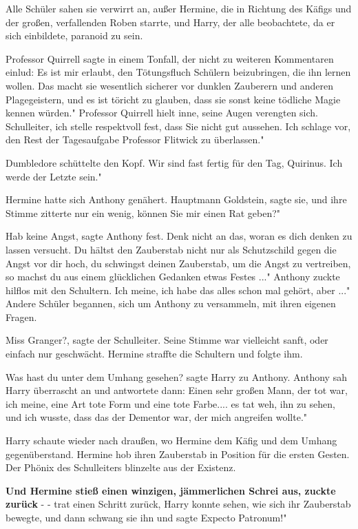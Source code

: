 Alle Schüler sahen sie verwirrt an, außer Hermine, die in Richtung des Käfigs
und der großen, verfallenden Roben starrte, und Harry, der alle beobachtete, da
er sich einbildete, paranoid zu sein.

Professor Quirrell sagte in einem Tonfall, der nicht zu weiteren Kommentaren
einlud: \glqq{}Es ist mir erlaubt, den Tötungsfluch Schülern beizubringen, die
ihn lernen wollen. Das macht sie wesentlich sicherer vor dunklen Zauberern und
anderen Plagegeistern, und es ist töricht zu glauben, dass sie sonst keine
tödliche Magie kennen würden." Professor Quirrell hielt inne, seine Augen
verengten sich. \glqq{}Schulleiter, ich stelle respektvoll fest, dass Sie nicht
gut aussehen. Ich schlage vor, den Rest der Tagesaufgabe Professor Flitwick zu
überlassen."

Dumbledore schüttelte den Kopf. \glqq{}Wir sind fast fertig für den Tag,
Quirinus. Ich werde der Letzte sein."

Hermine hatte sich Anthony genähert. \glqq{}Hauptmann Goldstein\grqq{}, sagte
sie, und ihre Stimme zitterte nur ein wenig, \glqq{}können Sie mir einen Rat
geben?"

\glqq{}Hab keine Angst\grqq{}, sagte Anthony fest. \glqq{}Denk nicht an das, woran
es dich denken zu lassen versucht. Du hältst den Zauberstab nicht nur als
Schutzschild gegen die Angst vor dir hoch, du schwingst deinen Zauberstab, um
die Angst zu vertreiben, so machst du aus einem glücklichen Gedanken etwas
Festes ..." Anthony zuckte hilflos mit den Schultern. \glqq{}Ich meine, ich habe
das alles schon mal gehört, aber ..." Andere Schüler begannen, sich um Anthony
zu versammeln, mit ihren eigenen Fragen.

\glqq{}Miss Granger?\grqq{}, sagte der Schulleiter. Seine Stimme war vielleicht
sanft, oder einfach nur geschwächt. Hermine straffte die Schultern und folgte
ihm.

\glqq{}Was hast du unter dem Umhang gesehen?\grqq{} sagte Harry zu Anthony.
Anthony sah Harry überrascht an und antwortete dann: \glqq{}Einen sehr großen
Mann, der tot war, ich meine, eine Art tote Form und eine tote Farbe.... es tat
weh, ihn zu sehen, und ich wusste, dass das der Dementor war, der mich angreifen
wollte."

Harry schaute wieder nach draußen, wo Hermine dem Käfig und dem Umhang
gegenüberstand. Hermine hob ihren Zauberstab in Position für die ersten Gesten.
Der Phönix des Schulleiters blinzelte aus der Existenz.

\textbf{ Und Hermine stieß einen winzigen, jämmerlichen Schrei aus, zuckte
zurück} - - trat einen Schritt zurück, Harry konnte sehen, wie sich ihr
Zauberstab bewegte, und dann schwang sie ihn und sagte \glqq{}Expecto Patronum!"

